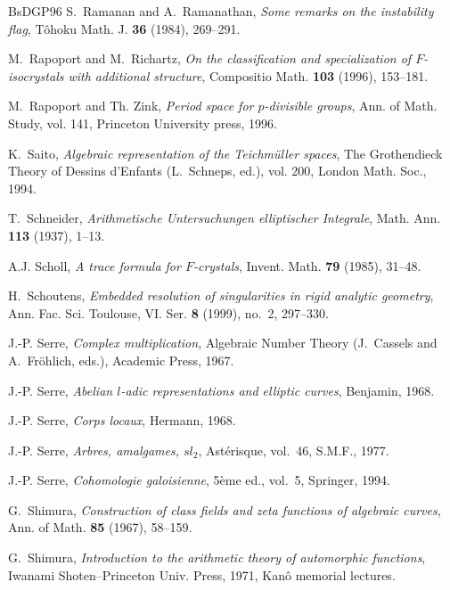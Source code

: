\begin{thebibliography}{BsDGP96}
S.~Ramanan and A.~Ramanathan, \emph{Some remarks on the instability flag},
  T\^ohoku Math. J. \textbf{36} (1984), 269--291.

M.~Rapoport and M.~Richartz, \emph{On the classification and specialization of
  ${F}$-isocrystals with additional structure}, Compositio Math. \textbf{103}
  (1996), 153--181.

M.~Rapoport and Th. Zink, \emph{Period space for $p$-divisible groups}, Ann. of
  Math. Study, vol. 141, Princeton University press, 1996.

K.~Saito, \emph{Algebraic representation of the {T}eichm\"uller spaces}, The
  Grothendieck Theory of Dessins d'Enfants (L.~Schneps, ed.), vol. 200, London
  Math. Soc., 1994.

T.~Schneider, \emph{Arithmetische {U}ntersuchungen elliptischer {I}ntegrale},
  Math. Ann. \textbf{113} (1937), 1--13.

A.J. Scholl, \emph{A trace formula for ${F}$-crystals}, Invent. Math.
  \textbf{79} (1985), 31--48.

H.~Schoutens, \emph{Embedded resolution of singularities in rigid analytic
  geometry}, Ann. Fac. Sci. Toulouse, VI. Ser. \textbf{8} (1999), no.~2,
  297--330.

J.-P. Serre, \emph{Complex multiplication}, Algebraic Number Theory (J.~Cassels
  and A.~Fr\"ohlich, eds.), Academic Press, 1967.

J.-P. Serre, \emph{Abelian $l$-adic representations and elliptic curves},
  Benjamin, 1968.

J.-P. Serre, \emph{Corps locaux}, Hermann, 1968.

J.-P. Serre, \emph{Arbres, amalgames, $sl_2$}, Ast\'erisque, vol.~46, S.M.F.,
  1977.

J.-P. Serre, \emph{Cohomologie galoisienne}, 5\`eme ed., vol.~5, Springer,
  1994.

G.~Shimura, \emph{Construction of class fields and zeta functions of algebraic
  curves}, Ann. of Math. \textbf{85} (1967), 58--159.

G.~Shimura, \emph{Introduction to the arithmetic theory of automorphic
  functions}, Iwanami Shoten--Princeton Univ. Press, 1971, Kan\^o memorial
  lectures.


\end{thebibliography}

